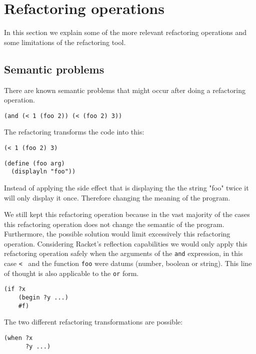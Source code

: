 \section{Refactoring operations}
In this section we explain some of the  more relevant refactoring operations and
some limitations of the refactoring tool.

\subsection{Semantic problems}
There are known semantic problems that might occur after doing a refactoring
operation.

\begin{lstlisting}[basicstyle=\ttfamily, caption="And example"]
  (and (< 1 (foo 2)) (< (foo 2) 3))
\end{lstlisting}
The refactoring transforms the code into this:
\begin{lstlisting}[basicstyle=\ttfamily, caption="Example"]
  (< 1 (foo 2) 3)
\end{lstlisting}

\begin{lstlisting}[basicstyle=\ttfamily, caption="Foo"]
(define (foo arg)
  (displayln "foo"))
\end{lstlisting}

Instead of applying the side effect that is displaying the the string "foo"
 twice it will only display it once. Therefore changing the meaning of the program.

We still kept this refactoring operation because in the vast majority
of the cases this refactoring operation does not change the semantic of the program.
Furthermore, the possible solution would limit excessively this refactoring operation.  %
Considering Racket's reflection capabilities we would only apply this refactoring operation
safely when the arguments of the {\tt and} expression, in this case {\tt < } and the function {\tt foo}
 were datums (number, boolean or string). This line of thought is also applicable to
 the {\tt or} form.



\begin{lstlisting}[basicstyle=\ttfamily, caption="Code sample"]
(if ?x
    (begin ?y ...)
    #f)
\end{lstlisting}
The two different refactoring transformations are possible:
\begin{lstlisting}[basicstyle=\ttfamily, caption="Refactoring option 1"]
(when ?x
      ?y ...)
\end{lstlisting}

